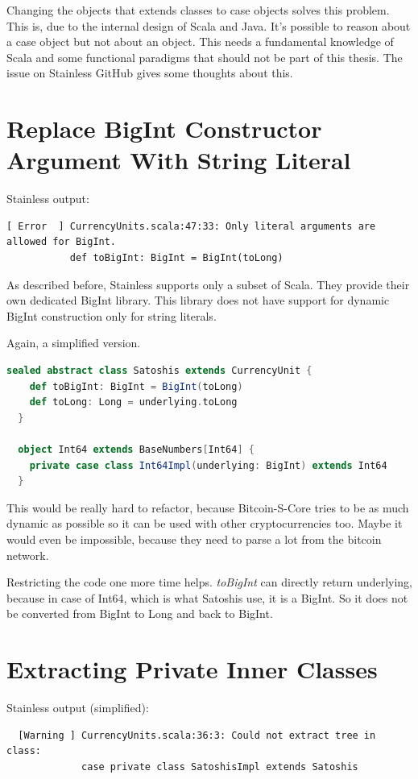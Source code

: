 Changing the objects that extends classes to case objects solves this problem.
This is, due to the internal design of Scala and Java.
It's possible to reason about a case object but not about an object.
This needs a fundamental knowledge of Scala and some functional paradigms that should not be part of this thesis.
The issue  on Stainless GitHub gives some thoughts about this.


\section{Replace BigInt Constructor Argument With String Literal}
Stainless output:
{\footnotesize\begin{verbatim}
[ Error  ] CurrencyUnits.scala:47:33: Only literal arguments are allowed for BigInt.
           def toBigInt: BigInt = BigInt(toLong)
\end{verbatim}}

As described before, Stainless supports only a subset of Scala.
They provide their own dedicated BigInt library.
This library does not have support for dynamic BigInt construction only for string literals.

Again, a simplified version.
\begin{lstlisting}[language=scala]
  sealed abstract class Satoshis extends CurrencyUnit {
    def toBigInt: BigInt = BigInt(toLong)
    def toLong: Long = underlying.toLong
  }

  object Int64 extends BaseNumbers[Int64] {
    private case class Int64Impl(underlying: BigInt) extends Int64
  }
\end{lstlisting}

This would be really hard to refactor, because Bitcoin-S-Core tries to be as much dynamic as possible so it can be used with other cryptocurrencies too.
Maybe it would even be impossible, because they need to parse a lot from the bitcoin network.

Restricting the code one more time helps.
\emph{toBigInt} can directly return underlying, because in case of Int64, which is what Satoshis use, it is a BigInt.
So it does not be converted from BigInt to Long and back to BigInt.


\section{Extracting Private Inner Classes}
Stainless output (simplified):
{\footnotesize\begin{verbatim}
  [Warning ] CurrencyUnits.scala:36:3: Could not extract tree in class:
             case private class SatoshisImpl extends Satoshis
\end{verbatim}}

